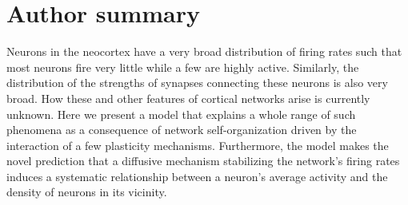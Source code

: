 \documentclass[10pt,letterpaper]{article}
\begin{document}
\section*{Author summary}
Neurons in the neocortex have a very broad distribution of firing rates such that most neurons fire very little while a few are highly active. Similarly, the distribution of the strengths of synapses connecting these neurons is also very broad. How these and other features of cortical networks arise is currently unknown. Here we present a model that explains a whole range of such phenomena as a consequence of network self-organization driven by the interaction of a few plasticity mechanisms. Furthermore, the model makes the novel prediction that a diffusive mechanism stabilizing the network’s firing rates induces a systematic relationship between a neuron’s average activity and the density of neurons in its vicinity.
\end{document}
